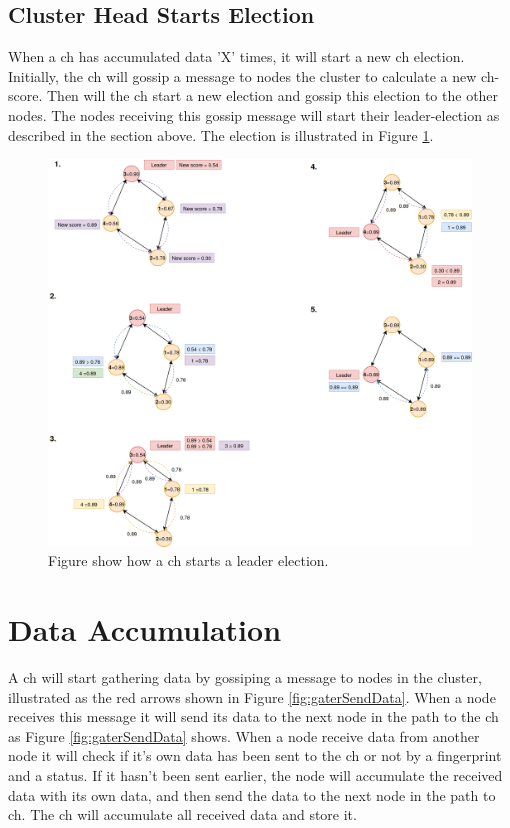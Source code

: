 \documentclass[USenglish]{uit-thesis}
\begin{document}
\newpage 

\subsection{Cluster Head Starts Election}
When a \gls{ch} has accumulated data 'X' times, it will start a new \gls{ch} election. Initially, the \gls{ch} will gossip a message to nodes the cluster to calculate a new \gls{ch}-score. Then will the \gls{ch} start a new election and gossip this election to the other nodes. The nodes receiving this gossip message will start their leader-election as described in the section above. The election is illustrated in Figure \ref{fig:chWantsLeaderElection}.

\begin{figure}
\centering
\includegraphics[width=\textwidth]{LeaderNewLeaderElection2.png}
\caption{Figure show how a \gls{ch} starts a leader election.}
\label{fig:chWantsLeaderElection}
\end{figure}


\newpage

\section{Data Accumulation}
A \gls{ch} will start gathering data by gossiping a message to nodes in the cluster, illustrated as the red arrows shown in Figure \ref{fig:gaterSendData}. When a node receives this message it will send its data to the next node in the path to the \gls{ch} as Figure \ref{fig:gaterSendData} shows. When a node receive data from another node it will check if it's own data has been sent to the \gls{ch} or not by a fingerprint and a status. If it hasn't been sent earlier, the node will accumulate the received data with its own data, and then send the data to the next node in the path to \gls{ch}. The \gls{ch} will accumulate all received data and store it.
\end{document}
